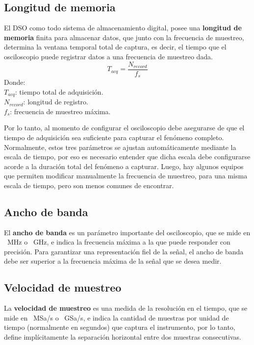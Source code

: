\subsection{Longitud de memoria}
El DSO como todo sistema de almacenamiento digital, posee una \textbf{longitud de memoria} finita para almacenar datos, que junto con la frecuencia de muestreo, determina la ventana temporal total de captura, es decir, el tiempo que el osciloscopio puede registrar datos a una frecuencia de muestreo dada.
\begin{equation}
    T_{acq} = \dfrac{N_{record}}{f_s}
\end{equation}
Donde:\\
$T_{acq}$: tiempo total de adquisición.\\
$N_{record}$: longitud de registro.\\
$f_s$: frecuencia de muestreo máxima.

Por lo tanto, al momento de configurar el osciloscopio debe asegurarse de que el tiempo de adquisición sea suficiente para capturar el fenómeno completo. Normalmente, estos tres parámetros se ajustan automáticamente mediante la escala de tiempo, por eso es necesario entender que dicha escala debe configurarse acorde a la duración total del fenómeno a capturar. Luego, hay algunos equipos que permiten modificar manualmente la frecuencia de muestreo, para una misma escala de tiempo, pero son menos comunes de encontrar.

\subsection{Ancho de banda}
El \textbf{ancho de banda} es un parámetro importante del osciloscopio, que se mide en \SI{}{MHz} o \SI{}{GHz}, e indica la frecuencia máxima a la que puede responder con precisión. Para garantizar una representación fiel de la señal, el ancho de banda debe ser superior a la frecuencia máxima de la señal que se desea medir.

\subsection{Velocidad de muestreo}
La \textbf{velocidad de muestreo} es una medida de la resolución en el tiempo, que se mide en \SI{}{MSa/s} o \SI{}{GSa/s}, e indica la cantidad de muestras por unidad de tiempo (normalmente en segundos) que captura el instrumento, por lo tanto, define implícitamente la separación horizontal entre dos muestras consecutivas.

















